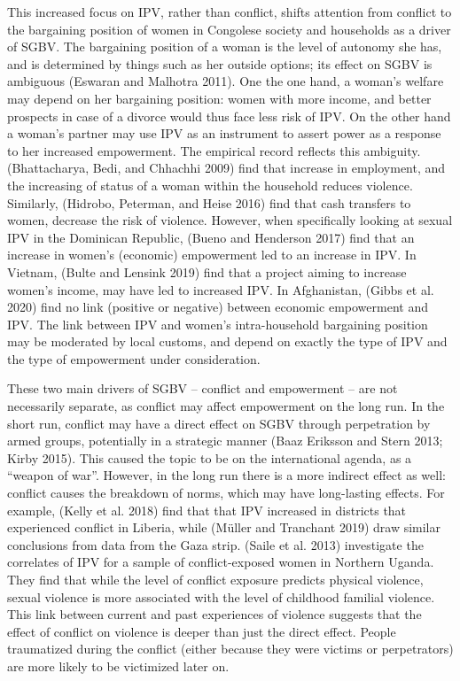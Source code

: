 \documentclass[
]{article}
\begin{document}
This increased focus on IPV, rather than conflict, shifts attention from
conflict to the bargaining position of women in Congolese society and
households as a driver of SGBV. The bargaining position of a woman is
the level of autonomy she has, and is determined by things such as her
outside options; its effect on SGBV is ambiguous (Eswaran and Malhotra
2011). One the one hand, a woman's welfare may depend on her bargaining
position: women with more income, and better prospects in case of a
divorce would thus face less risk of IPV. On the other hand a woman's
partner may use IPV as an instrument to assert power as a response to
her increased empowerment. The empirical record reflects this ambiguity.
(Bhattacharya, Bedi, and Chhachhi 2009) find that increase in
employment, and the increasing of status of a woman within the household
reduces violence. Similarly, (Hidrobo, Peterman, and Heise 2016) find
that cash transfers to women, decrease the risk of violence. However,
when specifically looking at sexual IPV in the Dominican Republic,
(Bueno and Henderson 2017) find that an increase in women's (economic)
empowerment led to an increase in IPV. In Vietnam, (Bulte and Lensink
2019) find that a project aiming to increase women's income, may have
led to increased IPV. In Afghanistan, (Gibbs et al. 2020) find no link
(positive or negative) between economic empowerment and IPV. The link
between IPV and women's intra-household bargaining position may be
moderated by local customs, and depend on exactly the type of IPV and
the type of empowerment under consideration.

These two main drivers of SGBV -- conflict and empowerment -- are not
necessarily separate, as conflict may affect empowerment on the long
run. In the short run, conflict may have a direct effect on SGBV through
perpetration by armed groups, potentially in a strategic manner (Baaz
Eriksson and Stern 2013; Kirby 2015). This caused the topic to be on the
international agenda, as a ``weapon of war''. However, in the long run
there is a more indirect effect as well: conflict causes the breakdown
of norms, which may have long-lasting effects. For example, (Kelly et
al. 2018) find that that IPV increased in districts that experienced
conflict in Liberia, while (Müller and Tranchant 2019) draw similar
conclusions from data from the Gaza strip. (Saile et al. 2013)
investigate the correlates of IPV for a sample of conflict-exposed women
in Northern Uganda. They find that while the level of conflict exposure
predicts physical violence, sexual violence is more associated with the
level of childhood familial violence. This link between current and past
experiences of violence suggests that the effect of conflict on violence
is deeper than just the direct effect. People traumatized during the
conflict (either because they were victims or perpetrators) are more
likely to be victimized later on.
\end{document}
